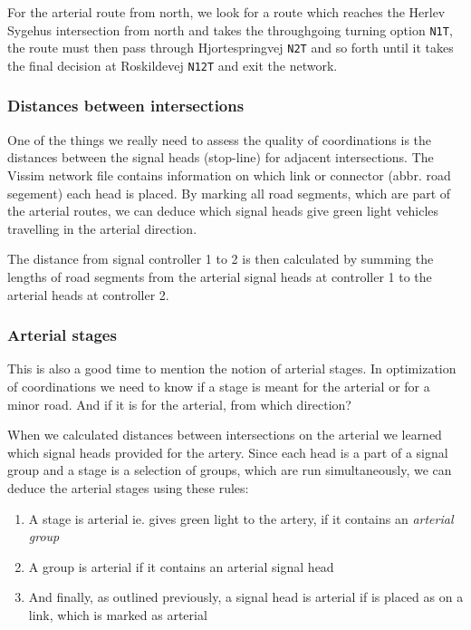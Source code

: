 For the arterial route from north, we look for a route which reaches the Herlev Sygehus intersection from north and takes the throughgoing turning option \verb|N1T|, the route must then pass through Hjortespringvej \verb|N2T| and so forth until it takes the final decision at Roskildevej \verb|N12T| and exit the network.

\subsubsection*{Distances between intersections}
One of the things we really need to assess the quality of coordinations is the distances between the signal heads (stop-line) for adjacent intersections. The Vissim network file contains information on which link or connector (abbr. road segement) each head is placed. By marking all road segments, which are part of the arterial routes, we can deduce which signal heads give green light vehicles travelling in the arterial direction.

The distance from signal controller 1 to 2 is then calculated by summing the lengths of road segments from the arterial signal heads at controller 1 to the arterial heads at controller 2.

\subsubsection*{Arterial stages}
This is also a good time to mention the notion of arterial stages. In optimization of coordinations we need to know if a stage is meant for the arterial or for a minor road. And if it is for the arterial, from which direction?

When we calculated distances between intersections on the arterial we learned which signal heads provided for the artery. Since each head is a part of a signal group and a stage is a selection of groups, which are run simultaneously, we can deduce the arterial stages using these rules:

\begin{enumerate}
\item A stage is arterial ie. gives green light to the artery, if it contains an \textit{arterial group}
\item A group is arterial if it contains an arterial signal head
\item And finally, as outlined previously, a signal head is arterial if is placed as on a link, which is marked as arterial
\end{enumerate}


